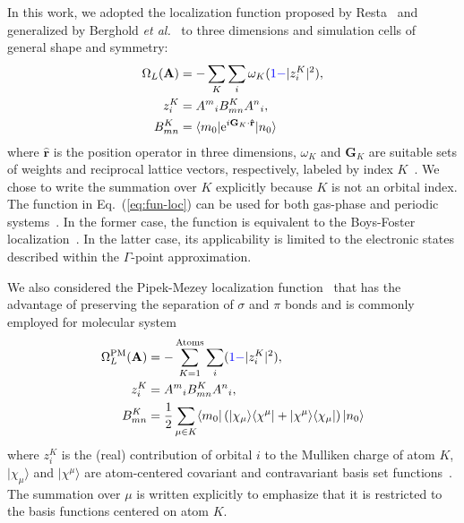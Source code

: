 \documentclass[aps,prl,reprint,amsmath,amssymb]{revtex4-1}
\newcommand*{\imi}{i} %
\newcommand*{\E}{\mathrm{e}}
\newcommand{\ket}[1]{\ensuremath{\vert #1 \rangle}}
\newcommand{\bra}[1]{\ensuremath{\langle #1 \vert}}
\newcommand{\ketbra}[2]{\ensuremath{\vert #1 \rangle \langle #2 \vert}} %
\newcommand{\op}[1]{\ensuremath{\hat{#1}}} %
\begin{document}
In this work, we adopted the localization function proposed by Resta~\cite{resta1998quantum, resta1999electron} and generalized by Berghold \emph{et al.}~\cite{berghold2000general} to three dimensions and simulation cells of general shape and symmetry: 
%
\begin{equation} \label{eq:fun-loc}
\begin{split}
\Omega_L(\mathbf{A}) &= - \sum_K \sum_i \omega_K (\color{blue}{1 -} \color{black}\vert z_{i}^{K} \vert^2), \\
z_{i}^{K} &= {A^m}_i B^{K}_{mn} {A^n}_i, \\
B^{K}_{mn} &= \bra{m_0} \E^{\imi \mathbf{G}_K \cdot \mathbf{\op{r}}} \ket{n_0}
\end{split}
\end{equation}
%
where $\mathbf{\op{r}}$ is the position operator in three dimensions, $\omega_K$ and $\mathbf{G}_K$ are suitable sets of weights and reciprocal lattice vectors, respectively, labeled by index $K$~\cite{silvestrelli1999maximally, berghold2000general}. We chose to write the summation over $K$ explicitly because $K$ is not an orbital index. The function in Eq.~(\ref{eq:fun-loc}) can be used for both gas-phase and periodic systems~\cite{berghold2000general}. In the former case, the function is equivalent to the Boys-Foster localization~\cite{berghold2000general, resta1999electron}. In the latter case, its applicability is limited to the electronic states described within the $\Gamma$-point approximation.

We also considered the Pipek-Mezey localization function~\cite{pipek1989fast,lehtola2014pipek} that has the advantage of preserving the separation of $\sigma$ and $\pi$ bonds and is commonly employed for molecular system
%
\begin{equation} \label{eq:pipek}
\begin{split}
\Omega_L^{\text{PM}}(\mathbf{A}) &= - \sum_{K=1}^{\text{Atoms}} \sum_i (\color{blue}{1 -} \color{black}\vert z_{i}^{K} \vert^2), \\
z_{i}^{K} &= {A^m}_i B^{K}_{mn} {A^n}_i, \\
B^{K}_{mn} &= \frac{1}{2} \sum_{\mu \in K} \bra{m_0}  \left( \ketbra{\chi_{\mu}}{\chi^{\mu}} + \ketbra{\chi^{\mu}}{\chi_{\mu}} \right) \ket{n_0}
\end{split}
\end{equation}
%
%
where $z_{i}^{K}$ is the (real) contribution of orbital $i$ to the Mulliken charge of atom $K$, $\ket{\chi_\mu}$ and $\ket{\chi^\mu}$ are atom-centered covariant and contravariant basis set functions~\cite{silvestrelli1999maximally, berghold2000general}. The summation over $\mu$ is written explicitly to emphasize that it is restricted to the basis functions centered on atom $K$. 
\end{document}
